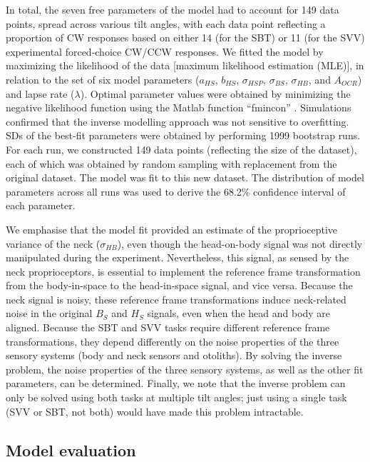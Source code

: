 In total, the seven free parameters of the model had to account for 149 data points, spread across various tilt angles, with each data point reflecting a proportion of CW responses based on either 14 (for the SBT) or 11 (for the SVV) experimental forced-choice CW/CCW responses. We fitted the model by maximizing the likelihood of the data [maximum likelihood estimation (MLE)], in relation to the set of six model parameters ($a_{HS}$, $b_{HS}$, $\sigma_{HSP}$, $\sigma_{BS}$, $\sigma_{HB}$, and $A_{OCR}$) and lapse rate ($\lambda$). Optimal parameter values were obtained by minimizing the negative likelihood function using the Matlab function ``fmincon'' \cite{devrijer2008, mcguire2009}. Simulations confirmed that the inverse modelling approach was not sensitive to overfitting. SDs of the best-fit parameters were obtained by performing 1999 bootstrap runs. For each run, we constructed 149 data points (reflecting the size of the dataset), each of which was obtained by random sampling with replacement from the original dataset. The model was fit to this new dataset. The distribution of model parameters across all runs was used to derive the 68.2\% confidence interval of each parameter. 

We emphasise that the model fit provided an estimate of the proprioceptive variance of the neck ($\sigma_{HB}$), even though the head-on-body signal was not directly manipulated during the experiment. Nevertheless, this signal, as sensed by the neck proprioceptors, is essential to implement the reference frame transformation from the body-in-space to the head-in-space signal, and vice versa. Because the neck signal is noisy, these reference frame transformations induce neck-related noise in the original $B_S$ and $H_S$ signals, even when the head and body are aligned. Because the SBT and SVV tasks require different reference frame transformations, they depend differently on the noise properties of the three sensory systems (body and neck sensors and otoliths). By solving the inverse problem, the noise properties of the three sensory systems, as well as the other fit parameters, can be determined. Finally, we note that the inverse problem can only be solved using both tasks at multiple tilt angles; just using a single task (SVV or SBT, not both) would have made this problem intractable. 

\subsection{Model evaluation}

